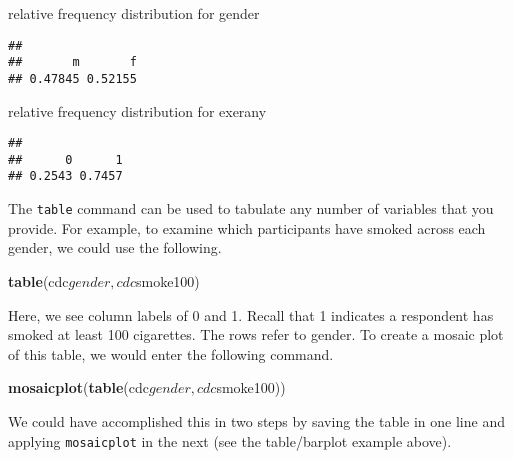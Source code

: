 \documentclass[]{article}
\newenvironment{Shaded}{\begin{snugshade}}{\end{snugshade}}
\newcommand{\KeywordTok}[1]{\textcolor[rgb]{0.13,0.29,0.53}{\textbf{{#1}}}}
\newcommand{\StringTok}[1]{\textcolor[rgb]{0.31,0.60,0.02}{{#1}}}
\newcommand{\NormalTok}[1]{{#1}}
\begin{document}
relative frequency distribution for gender

\begin{Shaded}
\end{Shaded}

\begin{verbatim}
## 
##       m       f 
## 0.47845 0.52155
\end{verbatim}

relative frequency distribution for exerany

\begin{Shaded}
\end{Shaded}

\begin{verbatim}
## 
##      0      1 
## 0.2543 0.7457
\end{verbatim}

The \texttt{table} command can be used to tabulate any number of
variables that you provide. For example, to examine which participants
have smoked across each gender, we could use the following.

\begin{Shaded}
\begin{Highlighting}[]
\KeywordTok{table}\NormalTok{(cdc$gender,cdc$smoke100)}
\end{Highlighting}
\end{Shaded}

Here, we see column labels of 0 and 1. Recall that 1 indicates a
respondent has smoked at least 100 cigarettes. The rows refer to gender.
To create a mosaic plot of this table, we would enter the following
command.

\begin{Shaded}
\begin{Highlighting}[]
\KeywordTok{mosaicplot}\NormalTok{(}\KeywordTok{table}\NormalTok{(cdc$gender,cdc$smoke100))}
\end{Highlighting}
\end{Shaded}

We could have accomplished this in two steps by saving the table in one
line and applying \texttt{mosaicplot} in the next (see the table/barplot
example above).
\end{document}
